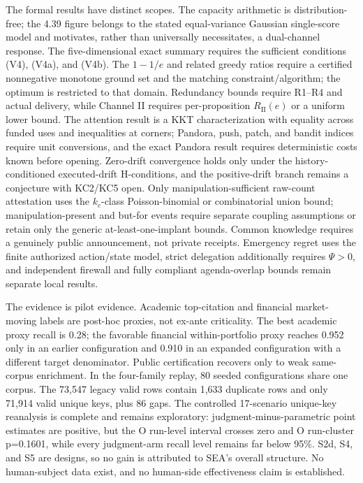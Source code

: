 \documentclass[
  11pt]{article}
\begin{document}
The formal results have distinct scopes. The capacity arithmetic is
distribution-free; the 4.39 figure belongs to the stated equal-variance
Gaussian single-score model and motivates, rather than universally
necessitates, a dual-channel response. The five-dimensional exact
summary requires the sufficient conditions (V4), (V4a), and (V4b). The
\(1-1/e\) and related greedy ratios require a certified nonnegative
monotone ground set and the matching constraint/algorithm; the optimum
is restricted to that domain. Redundancy bounds require R1--R4 and
actual delivery, while Channel II requires per-proposition
\(R_{\mathrm{II}}(e)\) or a uniform lower bound. The attention result is
a KKT characterization with equality across funded uses and inequalities
at corners; Pandora, push, patch, and bandit indices require unit
conversions, and the exact Pandora result requires deterministic costs
known before opening. Zero-drift convergence holds only under the
history-conditioned executed-drift H-conditions, and the positive-drift
branch remains a conjecture with KC2/KC5 open. Only
manipulation-sufficient raw-count attestation uses the \(k_c\)-class
Poisson-binomial or combinatorial union bound; manipulation-present and
but-for events require separate coupling assumptions or retain only the
generic at-least-one-implant bounds. Common knowledge requires a
genuinely public announcement, not private receipts. Emergency regret
uses the finite authorized action/state model, strict delegation
additionally requires \(\Psi>0\), and independent firewall and fully
compliant agenda-overlap bounds remain separate local results.

The evidence is pilot evidence. Academic top-citation and financial
market-moving labels are post-hoc proxies, not ex-ante criticality. The
best academic proxy recall is 0.28; the favorable financial
within-portfolio proxy reaches 0.952 only in an earlier configuration
and 0.910 in an expanded configuration with a different target
denominator. Public certification recovers only to weak same-corpus
enrichment. In the four-family replay, 80 seeded configurations share
one corpus. The 73,547 legacy valid rows contain 1,633 duplicate rows
and only 71,914 valid unique keys, plus 86 gaps. The controlled
17-scenario unique-key reanalysis is complete and remains exploratory:
judgment-minus-parametric point estimates are positive, but the O
run-level interval crosses zero and O run-cluster p=0.1601, while every
judgment-arm recall level remains far below 95\%. S2d, S4, and S5 are
designs, so no gain is attributed to SEA's overall structure. No
human-subject data exist, and no human-side effectiveness claim is
established.
\end{document}
